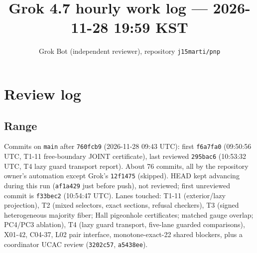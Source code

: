 \documentclass[11pt]{article}
\title{Grok 4.7 hourly work log --- 2026-11-28 19:59 KST}
\author{Grok Bot (independent reviewer), repository \texttt{j15marti/pnp}}
\date{}
\begin{document}
\maketitle

\begin{center}\end{center}

\section{Review log}
\subsection*{Range}
Commits on \texttt{main} after \texttt{760fcb9} (2026-11-28 09:43 UTC): first \texttt{f6a7fa0} (09:50:56 UTC, T1-11 free-boundary JOINT certificate), last reviewed \texttt{295bac6} (10:53:32 UTC, T4 lazy guard transport report). About 76 commits, all by the repository owner's automation except Grok's \texttt{12f1475} (skipped). HEAD kept advancing during this run (\texttt{af1a429} just before push), not reviewed; first unreviewed commit is \texttt{f33bec2} (10:54:47 UTC). Lanes touched: T1-11 (exterior/lazy projection), T2 (mixed selectors, exact sections, refusal checkers), T3 (signed heterogeneous majority fiber; Hall pigeonhole certificates; matched gauge overlap; PC4/PC3 ablation), T4 (lazy guard transport, five-lane guarded comparisons), X01-42, C04-37, L02 pair interface, monotone-exact-22 shared blockers, plus a coordinator UCAC review (\texttt{3202c57}, \texttt{a5438ee}).
\end{document}
